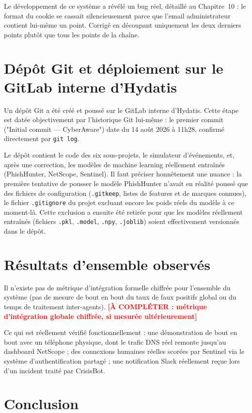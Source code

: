 \documentclass[12pt,a4paper]{report}
\newcommand{\TODO}[1]{\textcolor{red}{\textbf{[À COMPLÉTER : #1]}}}
\begin{document}
Le développement de ce système a révélé un bug réel, détaillé au Chapitre~10 : le format du cookie se cassait silencieusement parce que l'email administrateur contient lui-même un point. Corrigé en découpant uniquement les deux derniers points plutôt que tous les points de la chaîne.

\section{Dépôt Git et déploiement sur le GitLab interne d'Hydatis}

Un dépôt Git a été créé et poussé sur le GitLab interne d'Hydatis. Cette étape est datée objectivement par l'historique Git lui-même : le premier commit ("Initial commit — CyberAware") date du 14 août 2026 à 11h28, confirmé directement par \texttt{git log}.

Le dépôt contient le code des six sous-projets, le simulateur d'événements, et, après une correction, les modèles de machine learning réellement entraînés (PhishHunter, NetScope, Sentinel). Il faut préciser honnêtement une nuance : la première tentative de pousser le modèle PhishHunter n'avait en réalité poussé que des fichiers de configuration (\texttt{.gitkeep}, listes de features et de marques connues), le fichier \texttt{.gitignore} du projet excluant encore les poids réels du modèle à ce moment-là. Cette exclusion a ensuite été retirée pour que les modèles réellement entraînés (fichiers \texttt{.pkl}, \texttt{.model}, \texttt{.npy}, \texttt{.joblib}) soient effectivement versionnés dans le dépôt.

\section{Résultats d'ensemble observés}

Il n'existe pas de métrique d'intégration formelle chiffrée pour l'ensemble du système (pas de mesure de bout en bout du taux de faux positifs global ou du temps de traitement inter-agents). \TODO{métrique d'intégration globale chiffrée, si mesurée ultérieurement}

Ce qui est réellement vérifié fonctionnellement : une démonstration de bout en bout avec un téléphone physique, dont le trafic DNS réel remonte jusqu'au dashboard NetScope ; des connexions humaines réelles scorées par Sentinel via le système d'authentification partagé ; une notification Slack réellement reçue lors d'un incident traité par CrisisBot.

\section{Conclusion}
\end{document}
